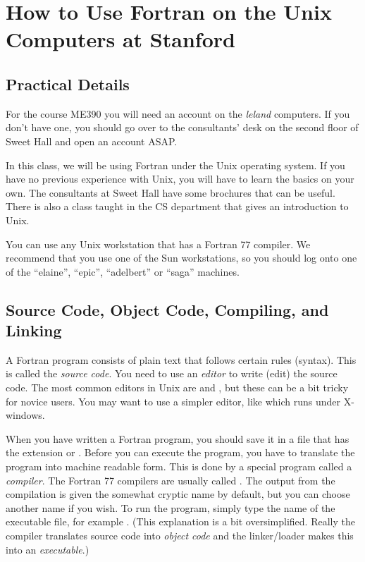 \section{How to Use Fortran on the Unix Computers at Stanford}

\subsection*{Practical Details}

For the course ME390 you will need an account on the \textit{leland}
computers. If you don't have one, you should go over to the consultants'
desk on the second floor of Sweet Hall and open an account ASAP.

In this class, we will be using Fortran under the Unix operating system.
If you have no previous experience with Unix, you will have to learn the
basics on your own. The consultants at Sweet Hall have some brochures
that can be useful. There is also a class taught in the CS department
that gives an introduction to Unix.

You can use any Unix workstation that has a Fortran 77 compiler. We
recommend that you use one of the Sun workstations, so you should log
onto one of the ``elaine'', ``epic'', ``adelbert'' or ``saga'' machines.


\subsection*{Source Code, Object Code, Compiling, and Linking}

A Fortran program consists of plain text that follows certain rules
(syntax). This is called the \textit{source code}. You need to use an
\textit{editor} to write (edit) the source code. The most common editors
in Unix are  and , but these can be a
bit tricky for novice users. You may want to use a simpler editor, like
 which runs under X-windows.

When you have written a Fortran program, you should save it in a file
that has the extension  or . Before you
can execute the program, you have to translate the program into machine
readable form. This is done by a special program called a
\textit{compiler}. The Fortran 77 compilers are usually called
. The output from the compilation is given the somewhat
cryptic name  by default, but you can choose another
name if you wish. To run the program, simply type the name of the
executable file, for example . (This explanation is a
bit oversimplified. Really the compiler translates source code into
\textit{object code} and the linker/loader makes this into an
\textit{executable}.)



